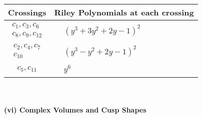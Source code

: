 \documentclass[1p]{elsarticle_modified}
\theoremstyle{definition}
\begin{document}
\begin{tabular}{m{50pt}|m{274pt}}
Crossings & \hspace{64pt}Riley Polynomials at each crossing \\
\hline $$\begin{aligned}c_{1},c_{3},c_{6}\\c_{8},c_{9},c_{12}\end{aligned}$$&$\begin{aligned}
&(y^3+3 y^2+2 y-1)^2
\end{aligned}$\\
\hline $$\begin{aligned}c_{2},c_{4},c_{7}\\c_{10}\end{aligned}$$&$\begin{aligned}
&(y^3- y^2+2 y-1)^2
\end{aligned}$\\
\hline $$\begin{aligned}c_{5},c_{11}\end{aligned}$$&$\begin{aligned}
&y^6
\end{aligned}$\\
\hline
\end{tabular}\\~\\
\newpage\flushleft \textbf{(vi) Complex Volumes and Cusp Shapes}
\end{document}
